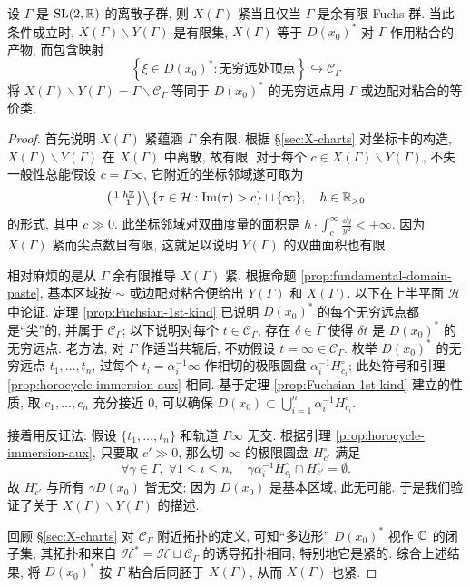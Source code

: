 \begin{theorem}\label{prop:Fuchsian-1st-kind-pasting}
	设 $\Gamma$ 是 $\operatorname{SL}(2, \mathbb{R})$ 的离散子群, 则 $X(\Gamma)$ 紧当且仅当 $\Gamma$ 是余有限 Fuchs 群. 当此条件成立时, $X(\Gamma) \smallsetminus Y(\Gamma)$ 是有限集, $X(\Gamma)$ 等于 $D(x_0)^*$ 对 $\Gamma$ 作用粘合的产物, 而包含映射
	\[ \left\{ \xi \in D(x_0)^*: \text{无穷远处顶点} \right\} \hookrightarrow \mathcal{C}_\Gamma \]
	将 $X(\Gamma) \smallsetminus Y(\Gamma) = \Gamma \backslash \mathcal{C}_\Gamma$ 等同于 $D(x_0)^*$ 的无穷远点用 $\Gamma$ 或边配对粘合的等价类.
\end{theorem}
\begin{proof}
	首先说明 $X(\Gamma)$ 紧蕴涵 $\Gamma$ 余有限. 根据 \S\ref{sec:X-charts} 对坐标卡的构造, $X(\Gamma) \smallsetminus Y(\Gamma)$ 在 $X(\Gamma)$ 中离散, 故有限. 对于每个 $c \in X(\Gamma) \smallsetminus Y(\Gamma)$, 不失一般性总能假设 $c = \Gamma \infty$, 它附近的坐标邻域遂可取为
	\[ \bigl(\begin{smallmatrix} 1 & h\mathbb{Z} \\  & 1 \end{smallmatrix}\bigr) \big\backslash \left\{ \tau \in \mathcal{H} : \operatorname{Im}(\tau) > c \right\} \sqcup \{\infty\} , \quad h \in \mathbb{R}_{>0} \]
	的形式, 其中 $c \gg 0$. 此坐标邻域对双曲度量的面积是 $h \cdot \int_c^\infty \frac{\dd y}{y^2} < +\infty$. 因为 $X(\Gamma)$ 紧而尖点数目有限, 这就足以说明 $Y(\Gamma)$ 的双曲面积也有限.

	相对麻烦的是从 $\Gamma$ 余有限推导 $X(\Gamma)$ 紧. 根据命题 \ref{prop:fundamental-domain-paste}, 基本区域按 $\sim$ 或边配对粘合便给出 $Y(\Gamma)$ 和 $X(\Gamma)$. 以下在上半平面 $\mathcal{H}$ 中论证. 定理 \ref{prop:Fuchsian-1st-kind} 已说明 $D(x_0)^*$ 的每个无穷远点都是``尖''的, 并属于 $\mathcal{C}_\Gamma$; 以下说明对每个 $t \in \mathcal{C}_\Gamma$, 存在 $\delta \in \overline{\Gamma}$ 使得 $\delta t$ 是 $D(x_0)^*$ 的无穷远点. 老方法, 对 $\Gamma$ 作适当共轭后, 不妨假设 $t = \infty \in \mathcal{C}_\Gamma$. 枚举 $D(x_0)^*$ 的无穷远点 $t_1, \ldots, t_n$, 过每个 $t_i = \alpha_i^{-1} \infty$ 作相切的极限圆盘 $\alpha_i^{-1} H^\circ_{c_i}$; 此处符号和引理 \ref{prop:horocycle-immersion-aux} 相同. 基于定理 \ref{prop:Fuchsian-1st-kind} 建立的性质, 取 $c_1, \ldots, c_n$ 充分接近 $0$, 可以确保 $D(x_0) \subset \bigcup_{i=1}^n \alpha_i^{-1} H^\circ_{c_i}$.
	
	接着用反证法: 假设 $\{t_1, \ldots, t_n\}$ 和轨道 $\Gamma \infty$ 无交. 根据引理 \ref{prop:horocycle-immersion-aux}, 只要取 $c' \gg 0$, 那么切 $\infty$ 的极限圆盘 $H_{c'}^\circ$ 满足
	\[ \forall \gamma \in \Gamma, \; \forall 1 \leq i \leq n, \quad \gamma\alpha_i^{-1} H_{c_i}^\circ \cap H^\circ_{c'} = \emptyset. \]
	故 $H^\circ_{c'}$ 与所有 $\gamma D(x_0)$ 皆无交; 因为 $D(x_0)$ 是基本区域, 此无可能. 于是我们验证了关于 $X(\Gamma) \smallsetminus Y(\Gamma)$ 的描述.
	
	回顾 \S\ref{sec:X-charts} 对 $\mathcal{C}_\Gamma$ 附近拓扑的定义, 可知``多边形'' $D(x_0)^*$ 视作 $\mathbb{C}$ 的闭子集, 其拓扑和来自 $\mathcal{H}^* = \mathcal{H} \sqcup \mathcal{C}_\Gamma$ 的诱导拓扑相同, 特别地它是紧的. 综合上述结果, 将 $D(x_0)^*$ 按 $\Gamma$ 粘合后同胚于 $X(\Gamma)$, 从而 $X(\Gamma)$ 也紧.
\end{proof}

